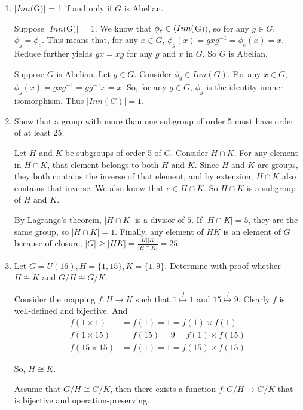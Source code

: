 \documentclass[12pt]{article}
\begin{document}
\begin{enumerate}
    \item $|Inn($G$)|$ = 1 if and only if $G$ is Abelian.

        Suppose $|Inn($G$)|$ = 1. We know that $\phi_e \in \text(Inn($G$))$, so for any $g \in G$, $\phi_g = \phi_e$. This means that, for any $x \in G$, $\phi_g(x) = gxg^{-1} = \phi_e(x) = x$. Reduce further yields $gx = xg$ for any $g$ and $x$ in $G$. So $G$ is Abelian.

        Suppose $G$ is Abelian. Let $g \in G$. Consider $\phi_g \in Inn(G)$. For any $x \in G$, $\phi_g(x) = gxg^{-1} = gg^{-1}x = x$. So, for any $g\in G$, $\phi_g$ is the identity innner isomorphism. Thus $|Inn(G)| = 1$.  
        \pagebreak

    \item Show that a group with more than one subgroup of order 5 must have order of at least 25.

        Let $H$ and $K$ be subgroups of order 5 of $G$. 
        Consider $H \cap K$. For any element in $H \cap K$, that element belongs to both $H$ and $K$. Since $H$ and $K$ are groups, they both contains the inverse of that element, and by extension, $H \cap K$ also contains that inverse. We also know that $e \in H\cap K$. So $H \cap K$ is a subgroup of $H$ and $K$. 

        By Lagrange's theorem, $|H\cap K|$ is a divisor of $5$. If $|H\cap K| = 5$, they are the same group, so $|H \cap K| = 1$. 
        Finally, any element of $HK$ is an element of $G$ because of closure, $|G| \geq |HK| = \frac{|H||K|}{|H\cap K|} = 25$.  
        \pagebreak
    
    \item Let $G = U(16), H = \{1, 15\}, K = \{1,9\}$. Determine with proof whether $H \cong K$ and $G/H \cong G/K$.

        Consider the mapping $f: H \to K$ such that $1 \overset{f}{\mapsto} 1$ and $15 \overset{f}{\mapsto} 9$. Clearly $f$ is well-defined and bijective.
        And 
        \begin{align*}
            f(1 \times 1) &= f(1) = 1 = f(1) \times f(1) \\
            f(1 \times 15) &= f(15) = 9 = f(1) \times f(15)\\
            f(15 \times 15) &= f(1) = 1 = f(15) \times f(15)
        \end{align*}

        So, $H \cong K$.

        Assume that $G/H \cong G/K$, then there exists a function $f: G/H \to G/K$ that is bijective and operation-preserving.
        

\end{enumerate}
\end{document}
